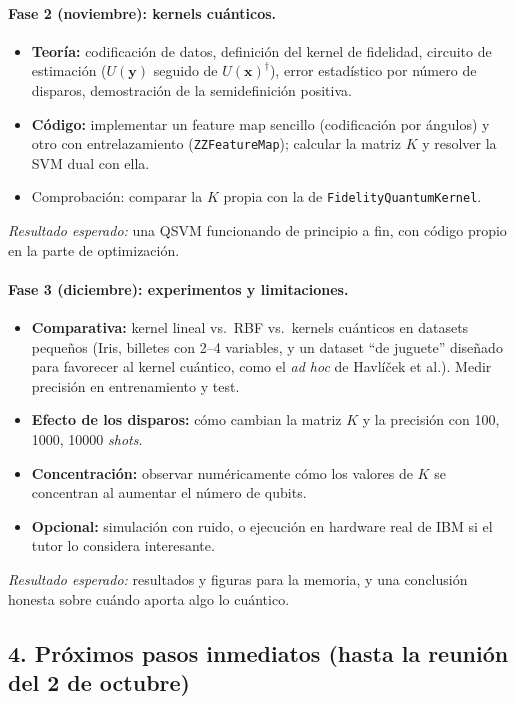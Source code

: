 \documentclass[12pt, a4paper]{article}
\begin{document}
\paragraph{Fase 2 (noviembre): kernels cuánticos.}\mbox{}
\begin{itemize}
    \item \textbf{Teoría:} codificación de datos, definición del kernel de fidelidad, circuito de estimación ($U(\mathbf{y})$ seguido de $U(\mathbf{x})^\dagger$), error estadístico por número de disparos, demostración de la semidefinición positiva.
    \item \textbf{Código:} implementar un feature map sencillo (codificación por ángulos) y otro con entrelazamiento (\texttt{ZZFeatureMap}); calcular la matriz $K$ y resolver la SVM dual con ella.
    \item Comprobación: comparar la $K$ propia con la de \texttt{FidelityQuantumKernel}.
\end{itemize}
\textit{Resultado esperado:} una QSVM funcionando de principio a fin, con código propio en la parte de optimización.

\paragraph{Fase 3 (diciembre): experimentos y limitaciones.}\mbox{}
\begin{itemize}
    \item \textbf{Comparativa:} kernel lineal vs.\ RBF vs.\ kernels cuánticos en datasets pequeños (Iris, billetes con 2--4 variables, y un dataset ``de juguete'' diseñado para favorecer al kernel cuántico, como el \textit{ad hoc} de Havlíček et al.). Medir precisión en entrenamiento y test.
    \item \textbf{Efecto de los disparos:} cómo cambian la matriz $K$ y la precisión con 100, 1000, 10000 \textit{shots}.
    \item \textbf{Concentración:} observar numéricamente cómo los valores de $K$ se concentran al aumentar el número de qubits.
    \item \textbf{Opcional:} simulación con ruido, o ejecución en hardware real de IBM si el tutor lo considera interesante.
\end{itemize}
\textit{Resultado esperado:} resultados y figuras para la memoria, y una conclusión honesta sobre cuándo aporta algo lo cuántico.

\subsection*{4. Próximos pasos inmediatos (hasta la reunión del 2 de octubre)}
\end{document}
